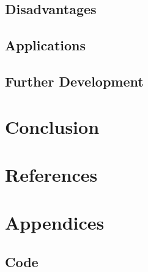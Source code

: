 \documentclass[11pt]{article}
\begin{document}
\subsection{Disadvantages}
\subsection{Applications}
\subsection{Further Development}

\section{Conclusion}


\clearpage
\section{References}
\printbibliography[heading=none]
\clearpage

\section{Appendices}
\subsection{Code}
\end{document}
